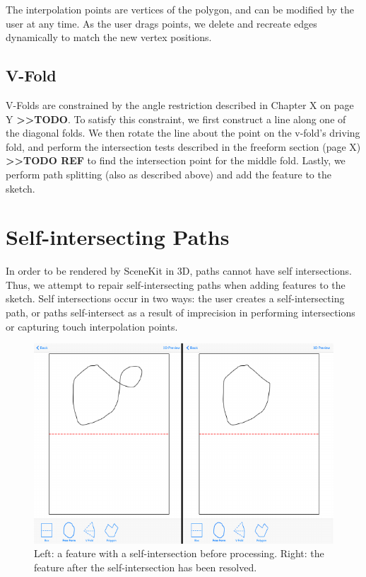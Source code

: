 The interpolation points are vertices of the polygon, and can be
modified by the user at any time. As the user drags points, we delete
and recreate edges dynamically to match the new vertex positions.

\subsection{V-Fold}\label{v-fold}

V-Folds are constrained by the angle restriction described in Chapter X
on page Y \textbf{\textgreater{}\textgreater{}TODO}. To satisfy this
constraint, we first construct a line along one of the diagonal folds.
We then rotate the line about the point on the v-fold's driving fold,
and perform the intersection tests described in the freeform section
(page X) \textbf{\textgreater{}\textgreater{}TODO REF} to find the
intersection point for the middle fold. Lastly, we perform path
splitting (also as described above) and add the feature to the sketch.

\section{Self-intersecting Paths}\label{self-intersecting-paths}

In order to be rendered by SceneKit in 3D, paths cannot have self
intersections. Thus, we attempt to repair self-intersecting paths when
adding features to the sketch. Self intersections occur in two ways: the
user creates a self-intersecting path, or paths self-intersect as a
result of imprecision in performing intersections or capturing touch
interpolation points. ~ ~

\begin{figure}[htbp]
\centering
\includegraphics{figures/41_Tech_Tool_Implementation/loopBeforeAfter.pdf}
\caption{Left: a feature with a self-intersection before processing.
Right: the feature after the self-intersection has been resolved.}
\end{figure}


